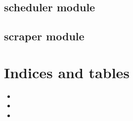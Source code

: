 \documentclass[letterpaper,10pt,english]{sphinxmanual}
\begin{document}
\section{scheduler module}
\label{\detokenize{scheduler:scheduler-module}}\label{\detokenize{scheduler::doc}}

\section{scraper module}
\label{\detokenize{scraper:scraper-module}}\label{\detokenize{scraper::doc}}

\chapter{Indices and tables}
\label{\detokenize{index:indices-and-tables}}\begin{itemize}
\item {} 

\item {} 

\item {} 

\end{itemize}


\renewcommand{\indexname}{Python Module Index}
\begin{sphinxtheindex}
\let\bigletter\sphinxstyleindexlettergroup
\bigletter{i}
\item\relax{}
\end{sphinxtheindex}

\renewcommand{\indexname}{Index}
\printindex
\end{document}
